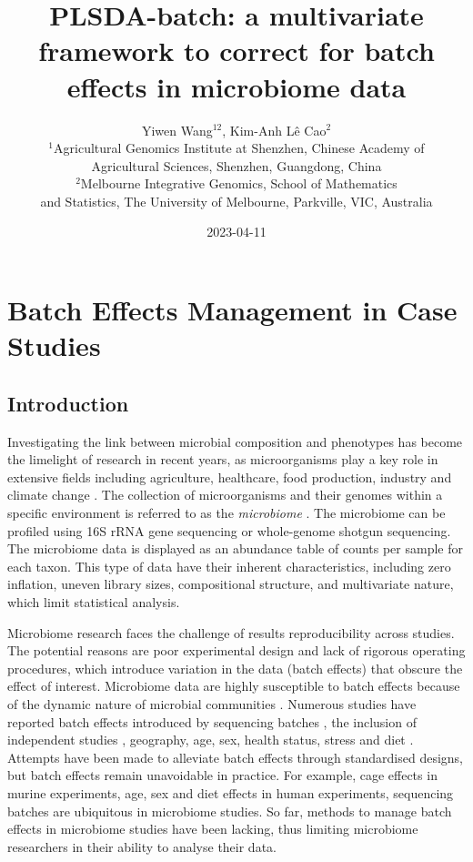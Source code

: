 \documentclass[
]{book}
\title{PLSDA-batch: a multivariate framework to correct for batch effects in microbiome data}
\author{Yiwen Wang\(^{12}\), Kim-Anh Lê Cao\(^2\)\\
\(^1\)Agricultural Genomics Institute at Shenzhen, Chinese Academy of\\
Agricultural Sciences, Shenzhen, Guangdong, China\\
\(^2\)Melbourne Integrative Genomics, School of Mathematics\\
and Statistics, The University of Melbourne, Parkville, VIC, Australia}
\date{2023-04-11}
\begin{document}
\maketitle

{
\setcounter{tocdepth}{3}
\tableofcontents
}
\hypertarget{batch-effects-management-in-case-studies}{%
\chapter{Batch Effects Management in Case Studies}\label{batch-effects-management-in-case-studies}}

\hypertarget{introduction}{%
\section{Introduction}\label{introduction}}

Investigating the link between microbial composition and phenotypes has become the limelight of research in recent years, as microorganisms play a key role in extensive fields including agriculture, healthcare, food production, industry and climate change \citep{wang2020characterizing, ray2020microbe, fan2020gut, poirier2020integrating}. The collection of microorganisms and their genomes within a specific environment is referred to as the \emph{microbiome} \citep{marchesi2015vocabulary}. The microbiome can be profiled using 16S rRNA gene sequencing or whole-genome shotgun sequencing. The microbiome data is displayed as an abundance table of counts per sample for each taxon. This type of data have their inherent characteristics, including zero inflation, uneven library sizes, compositional structure, and multivariate nature, which limit statistical analysis.

Microbiome research faces the challenge of results reproducibility across studies. The potential reasons are poor experimental design and lack of rigorous operating procedures, which introduce variation in the data (batch effects) that obscure the effect of interest. Microbiome data are highly susceptible to batch effects because of the dynamic nature of microbial communities \citep{wang2020managing}. Numerous studies have reported batch effects introduced by sequencing batches \citep{hieken2016microbiome}, the inclusion of independent studies \citep{duvallet2017meta}, geography, age, sex, health status, stress and diet \citep{gibson2004dietary, lozupone2013meta, haro2016intestinal, kim2017optimizing}. Attempts have been made to alleviate batch effects through standardised designs, but batch effects remain unavoidable in practice. For example, cage effects in murine experiments, age, sex and diet effects in human experiments, sequencing batches are ubiquitous in microbiome studies. So far, methods to manage batch effects in microbiome studies have been lacking, thus limiting microbiome researchers in their ability to analyse their data.
\end{document}
